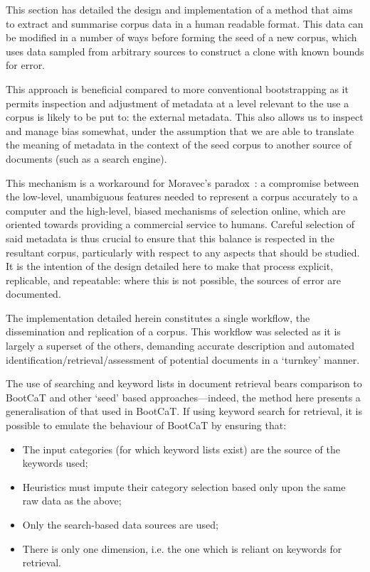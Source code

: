 

This section has detailed the design and implementation of a method that aims to extract and summarise corpus data in a human readable format.  This data can be modified in a number of ways before forming the seed of a new corpus, which uses data sampled from arbitrary sources to construct a clone with known bounds for error.

This approach is beneficial compared to more conventional bootstrapping as it permits inspection and adjustment of metadata at a level relevant to the use a corpus is likely to be put to: the external metadata.  This also allows us to inspect and manage bias somewhat, under the assumption that we are able to translate the meaning of metadata in the context of the seed corpus to another source of documents (such as a search engine).

This mechanism is a workaround for Moravec's paradox~\cite{moravec1988mind}: a compromise between the low-level, unambiguous features needed to represent a corpus accurately to a computer and the high-level, biased mechanisms of selection online, which are oriented towards providing a commercial service to humans.  Careful selection of said metadata is thus crucial to ensure that this balance is respected in the resultant corpus, particularly with respect to any aspects that should be studied.  It is the intention of the design detailed here to make that process explicit, replicable, and repeatable: where this is not possible, the sources of error are documented.

The implementation detailed herein constitutes a single workflow, the dissemination and replication of a corpus.  This workflow was selected as it is largely a superset of the others, demanding accurate description and automated identification/retrieval/assessment of potential documents in a `turnkey' manner.




The use of searching and keyword lists in document retrieval bears comparison to BootCaT and other `seed' based approaches---indeed, the method here presents a generalisation of that used in BootCaT.  If using keyword search for retrieval, it is possible to emulate the behaviour of BootCaT by ensuring that:

\begin{itemize}
    \item The input categories (for which keyword lists exist) are the source of the keywords used;
    \item Heuristics must impute their category selection based only upon the same raw data as the above;
    \item Only the search-based data sources are used;
    \item There is only one dimension, i.e. the one which is reliant on keywords for retrieval.
\end{itemize}

